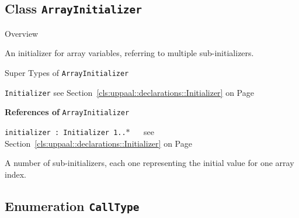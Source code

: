\subsection{Class \bfseries \texttt{ArrayInitializer}\normalfont}
\label{cls:uppaal::declarations::ArrayInitializer} 
	
	\begin{longdescription}
		\item[Overview] 		
				

	

		An initializer for array variables, referring to multiple sub-initializers.		
		\item[Super Types of \texttt{ArrayInitializer}] ~
			\begin{longdescription}
				\item[\texttt{Initializer}] see Section~\ref{cls:uppaal::declarations::Initializer} on Page~\pageref{cls:uppaal::declarations::Initializer}						\end{longdescription}
		
	
			\item[\textbf{References of} \texttt{ArrayInitializer}] ~
			\begin{longdescription}
	\item[\texttt{initializer : Initializer 	\symbol{"5B}1..$*$\symbol{"5D}
}] ~
	see Section~\ref{cls:uppaal::declarations::Initializer} on Page~\pageref{cls:uppaal::declarations::Initializer}
	
	\nopagebreak
		
				

	

		A number of sub-initializers, each one representing the initial value for one array index.		
			\end{longdescription}
	
	\end{longdescription}
	

\subsection{Enumeration \bfseries \texttt{CallType}\normalfont}
\label{cls:uppaal::declarations::CallType} 

